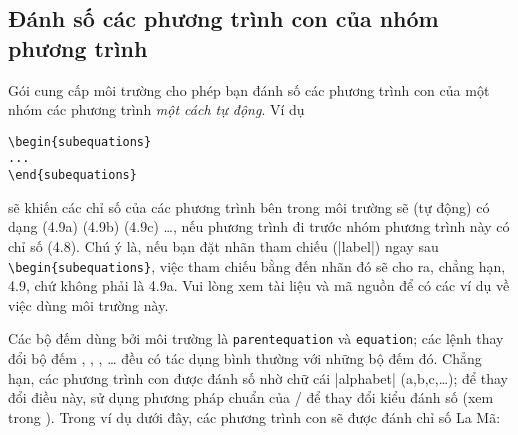 \documentclass[11pt,leqno,titlepage,openany,oneside]{amsldoc}[1999/12/13]
\begin{document}
\subsection{Đánh số các phương trình con của nhóm phương trình}

Gói  cung cấp môi trường  cho phép
bạn đánh số các phương trình con của một nhóm các phương trình
\emph{một cách tự động}. Ví dụ

\medskip
\begin{verbatim}
\begin{subequations}
...
\end{subequations}
\end{verbatim}

\medskip
\noindent
sẽ khiến các chỉ số của các phương trình bên trong môi trường
 sẽ (tự động) có dạng (4.9a) (4.9b) (4.9c) \dots,
nếu phương trình đi trước nhóm phương trình này có chỉ số (4.8).
Chú ý là, nếu bạn đặt nhãn tham chiếu (|label|) ngay sau
\verb/\begin{subequations}/, việc tham chiếu bằng 
đến nhãn đó sẽ cho ra, chẳng hạn, 4.9, chứ không phải là 4.9a.
Vui lòng xem tài liệu  và mã nguồn 
để có các ví dụ về việc dùng môi trường này.

\medskip
Các bộ đếm dùng bởi môi trường  là \verb/parentequation/
và \verb/equation/; các lệnh thay đổi bộ đếm
, , , \ldots
đều có tác dụng bình thường với những bộ đếm đó.
Chẳng hạn, các phương trình con được đánh số nhờ chữ cái |alphabet|
(a,b,c,\ldots); để thay đổi điều này, sử dụng phương pháp chuẩn
của \latex/ để thay đổi kiểu đánh số (xem trong \cite[\S6.3, \S C.8.4]{lamport}).
Trong ví dụ dưới đây, các phương trình con sẽ được đánh chỉ số La Mã:
\end{document}
